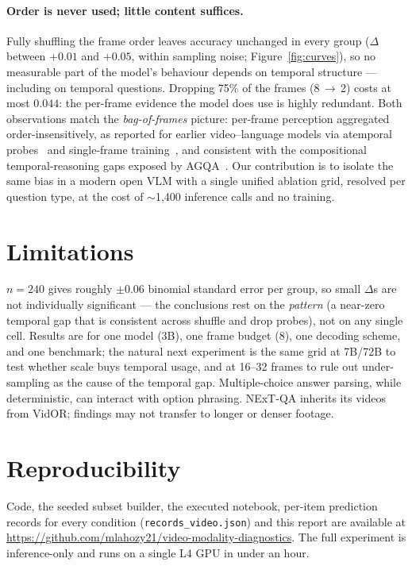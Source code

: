 \documentclass[11pt]{article}
\begin{document}
\paragraph{Order is never used; little content suffices.} Fully shuffling the
frame order leaves accuracy unchanged in every group ($\Delta$ between $+0.01$
and $+0.05$, within sampling noise; Figure~\ref{fig:curves}), so no measurable
part of the model's behaviour depends on temporal structure --- including on
temporal questions. Dropping 75\% of the frames (8\,$\to$\,2) costs at most
$0.044$: the per-frame evidence the model does use is highly redundant. Both
observations match the \emph{bag-of-frames} picture: per-frame perception
aggregated order-insensitively, as reported for earlier video--language models
via atemporal probes~\citep{buch2022revisiting} and single-frame
training~\citep{lei2023revealing}, and consistent with the compositional
temporal-reasoning gaps exposed by AGQA~\citep{grunde2021agqa}. Our
contribution is to isolate the same bias in a modern open VLM with a single
unified ablation grid, resolved per question type, at the cost of
$\sim$1{,}400 inference calls and no training.

\section{Limitations}

$n{=}240$ gives roughly $\pm 0.06$ binomial standard error per group, so small
$\Delta$s are not individually significant --- the conclusions rest on the
\emph{pattern} (a near-zero temporal gap that is consistent across shuffle and
drop probes), not on any single cell. Results are for one model (3B), one
frame budget (8), one decoding scheme, and one benchmark; the natural next
experiment is the same grid at 7B/72B to test whether scale buys temporal
usage, and at 16--32 frames to rule out under-sampling as the cause of the
temporal gap. Multiple-choice answer parsing, while deterministic, can
interact with option phrasing. NExT-QA inherits its videos from VidOR;
findings may not transfer to longer or denser footage.

\section{Reproducibility}

Code, the seeded subset builder, the executed notebook, per-item prediction
records for every condition (\texttt{records\_video.json}) and this report are
available at \url{https://github.com/mlahozy21/video-modality-diagnostics}.
The full experiment is inference-only and runs on a single L4 GPU in under an
hour.



\end{document}
